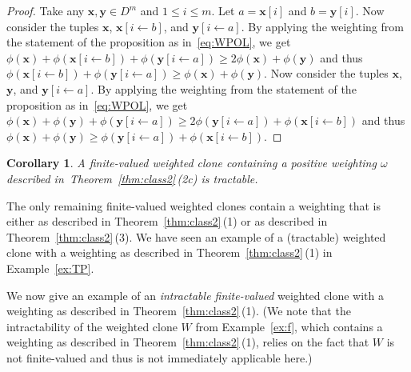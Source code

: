 \documentclass[11pt, reqno]{article}
\newcommand{\tup}[1]{\ensuremath{\mathbf #1}}
\newtheorem{corollary}{Corollary}
\theoremstyle{remark}
\begin{document}
\begin{proof}
Take any $\tup{x},\tup{y}\in D^m$ and $1\leq i\leq m$. 
Let $a=\tup{x}[i]$ and $b=\tup{y}[i]$. Now consider the tuples $\tup{x}$,
$\tup{x}[i\leftarrow b]$, and $\tup{y}[i\leftarrow a]$. 
By applying the
weighting from the statement of the proposition as in~\eqref{eq:WPOL}, we get
$\phi(\tup{x})+\phi(\tup{x}[i\leftarrow b])+\phi(\tup{y}[i\leftarrow a]) \geq
2\phi(\tup{x})+\phi(\tup{y})$ and thus $\phi(\tup{x}[i\leftarrow
b])+\phi(\tup{y}[i\leftarrow a]) \geq \phi(\tup{x})+\phi(\tup{y})$.
%
Now consider the tuples $\tup{x}$, $\tup{y}$, and $\tup{y}[i\leftarrow a]$. By
applying the weighting from the statement of the proposition as
in~\eqref{eq:WPOL}, we get
$\phi(\tup{x})+\phi(\tup{y})+\phi(\tup{y}[i\leftarrow a]) \geq 2\phi(\tup{y}[i\leftarrow a]) + \phi(\tup{x}[i\leftarrow b])$ and thus
$\phi(\tup{x})+\phi(\tup{y}) \geq \phi(\tup{y}[i\leftarrow a]) + \phi(\tup{x}[i\leftarrow b])$.
%
\end{proof}

\begin{corollary}
A finite-valued weighted clone containing a positive weighting $\omega$ described
in~Theorem~\ref{thm:class2}\,(2c) is tractable.
\end{corollary}

The only remaining finite-valued weighted clones contain a weighting that is
either as described in Theorem~\ref{thm:class2}\,(1) or as described in
Theorem~\ref{thm:class2}\,(3). We have seen an example of a (tractable) weighted
clone with a weighting as described in Theorem~\ref{thm:class2}\,(1) in
Example~\ref{ex:TP}. 

We now give an example of an \emph{intractable finite-valued} weighted clone
with a weighting as described in Theorem~\ref{thm:class2}\,(1). (We note that
the intractability of the weighted clone $W$ from Example~\ref{ex:f}, which
contains a weighting as described in Theorem~\ref{thm:class2}\,(1), relies on
the fact that $W$ is not finite-valued and thus is not immediately applicable
here.)
\end{document}
